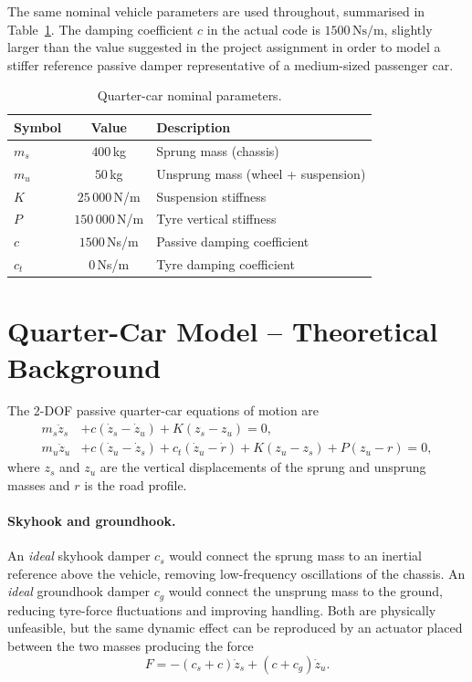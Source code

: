 The same nominal vehicle parameters are used throughout, summarised in
Table~\ref{tab:params}. The damping coefficient $c$ in the actual code
is $1500\,\mathrm{Ns/m}$, slightly larger than the value suggested in
the project assignment in order to model a stiffer reference passive
damper representative of a medium-sized passenger car.

\begin{table}[H]
    \centering
    \begin{tabular}{lcl}
        \toprule
        \textbf{Symbol} & \textbf{Value} & \textbf{Description} \\
        \midrule
        $m_s$  & $400$\,kg     & Sprung mass (chassis) \\
        $m_u$  & $50$\,kg      & Unsprung mass (wheel + suspension) \\
        $K$    & $25\,000$\,N/m   & Suspension stiffness \\
        $P$    & $150\,000$\,N/m  & Tyre vertical stiffness \\
        $c$    & $1500$\,Ns/m   & Passive damping coefficient \\
        $c_t$  & $0$\,Ns/m      & Tyre damping coefficient \\
        \bottomrule
    \end{tabular}
    \caption{Quarter-car nominal parameters.}
    \label{tab:params}
\end{table}

\section{Quarter-Car Model -- Theoretical Background}
\label{sec:theory}
The 2-DOF passive quarter-car equations of motion are
\begin{align}
    m_s \ddot z_s &+ c(\dot z_s - \dot z_u) + K(z_s - z_u) = 0,
    \label{eq:passive_s}\\
    m_u \ddot z_u &+ c(\dot z_u - \dot z_s) + c_t(\dot z_u - \dot r) +
    K(z_u - z_s) + P(z_u - r) = 0,
    \label{eq:passive_u}
\end{align}
where $z_s$ and $z_u$ are the vertical displacements of the sprung and
unsprung masses and $r$ is the road profile.

\paragraph{Skyhook and groundhook.}
An \emph{ideal} skyhook damper $c_s$ would connect the sprung mass to
an inertial reference above the vehicle, removing low-frequency
oscillations of the chassis. An \emph{ideal} groundhook damper $c_g$
would connect the unsprung mass to the ground, reducing tyre-force
fluctuations and improving handling. Both are physically unfeasible,
but the same dynamic effect can be reproduced by an actuator placed
between the two masses producing the force
\begin{equation}
    F = -(c_s + c)\dot z_s + (c + c_g)\dot z_u .
    \label{eq:realworld}
\end{equation}

